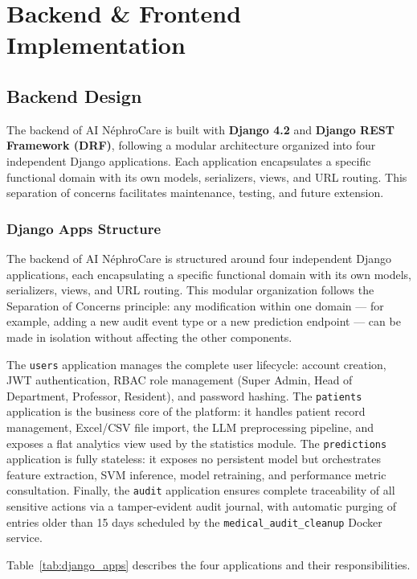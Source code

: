 \documentclass[12pt,a4paper,twoside]{report}
\begin{document}
\chapter{Backend \& Frontend Implementation}

\section{Backend Design}\label{sec:backend}

The backend of AI NéphroCare is built with \textbf{Django 4.2} and \textbf{Django REST Framework (DRF)}, following a modular architecture organized into four independent Django applications. Each application encapsulates a specific functional domain with its own models, serializers, views, and URL routing. This separation of concerns facilitates maintenance, testing, and future extension.

\subsection{Django Apps Structure}

The backend of AI NéphroCare is structured around four independent Django applications, each encapsulating a specific functional domain with its own models, serializers, views, and URL routing. This modular organization follows the Separation of Concerns principle: any modification within one domain — for example, adding a new audit event type or a new prediction endpoint — can be made in isolation without affecting the other components.

The \texttt{users} application manages the complete user lifecycle: account creation, JWT authentication, RBAC role management (Super Admin, Head of Department, Professor, Resident), and password hashing. The \texttt{patients} application is the business core of the platform: it handles patient record management, Excel/CSV file import, the LLM preprocessing pipeline, and exposes a flat analytics view used by the statistics module. The \texttt{predictions} application is fully stateless: it exposes no persistent model but orchestrates feature extraction, SVM inference, model retraining, and performance metric consultation. Finally, the \texttt{audit} application ensures complete traceability of all sensitive actions via a tamper-evident audit journal, with automatic purging of entries older than 15 days scheduled by the \texttt{medical\_audit\_cleanup} Docker service.

Table~\ref{tab:django_apps} describes the four applications and their responsibilities.
\end{document}
